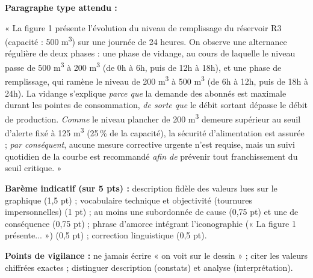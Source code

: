 \documentclass[11pt]{article}
\begin{document}
\begin{corrige}
\textbf{Paragraphe type attendu :}

« La figure 1 présente l'évolution du niveau de remplissage du réservoir R3 (capacité : 500 m\textsuperscript{3}) sur une journée de 24 heures. On observe une alternance régulière de deux phases : une phase de vidange, au cours de laquelle le niveau passe de 500 m\textsuperscript{3} à 200 m\textsuperscript{3} (de 0h à 6h, puis de 12h à 18h), et une phase de remplissage, qui ramène le niveau de 200 m\textsuperscript{3} à 500 m\textsuperscript{3} (de 6h à 12h, puis de 18h à 24h). La vidange s'explique \emph{parce que} la demande des abonnés est maximale durant les pointes de consommation, \emph{de sorte que} le débit sortant dépasse le débit de production. \emph{Comme} le niveau plancher de 200 m\textsuperscript{3} demeure supérieur au seuil d'alerte fixé à 125 m\textsuperscript{3} (25\,\% de la capacité), la sécurité d'alimentation est assurée ; \emph{par conséquent}, aucune mesure corrective urgente n'est requise, mais un suivi quotidien de la courbe est recommandé \emph{afin de} prévenir tout franchissement du seuil critique. »

\textbf{Barème indicatif (sur 5 pts) :} description fidèle des valeurs lues sur le graphique (1,5 pt) ; vocabulaire technique et objectivité (tournures impersonnelles) (1 pt) ; au moins une subordonnée de cause (0,75 pt) et une de conséquence (0,75 pt) ; phrase d'amorce intégrant l'iconographie (« La figure 1 présente... ») (0,5 pt) ; correction linguistique (0,5 pt).

\textbf{Points de vigilance :} ne jamais écrire « on voit sur le dessin » ; citer les valeurs chiffrées exactes ; distinguer description (constats) et analyse (interprétation).
\end{corrige}
\end{document}
